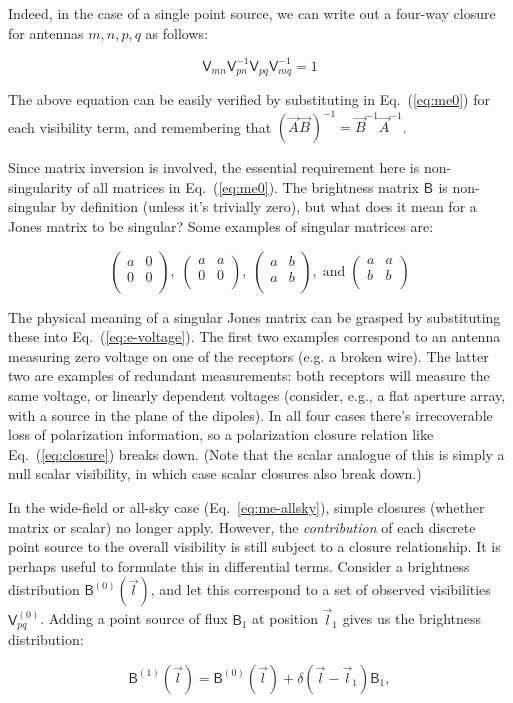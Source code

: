 \documentclass[referee]{aa}
\newcommand{\matrixtt}[4]{\left( \begin{array}{cc}#1&#2\\#3&#4\\\end{array} \right)}
\newcommand{\jones}[2]{\vec {#1}_{#2}}
\newcommand{\jonesinv}[2]{\vec {#1}^{-1}_{#2}}
\newcommand{\coh}[2]{\mathsf{{#1}}_{{#2}}}
\begin{document}
Indeed, in the case of a single point source, we can write out a four-way closure for antennas $m,n,p,q$ as follows:

\begin{equation}\label{eq:closure}
\coh{V}{mn}\coh{V}{pn}^{-1}\coh{V}{pq}\coh{V}{mq}^{-1} = 1
\end{equation}

The above equation can be easily verified by substituting in Eq.~(\ref{eq:me0}) for each visibility term, and remembering that $(\jones{A}{}\jones{B}{})^{-1}=\jonesinv{B}{}\jonesinv{A}{}$. 

Since matrix inversion is involved, the essential requirement here is non-singularity of all matrices in Eq.~(\ref{eq:me0}). The brightness matrix $\coh{B}{}$ is non-singular by definition (unless it's trivially zero), but what does it mean for a Jones matrix to be singular? Some examples of singular matrices are:

\[
\matrixtt{a}{0}{0}{0}, \; \matrixtt{a}{a}{0}{0}, \; \matrixtt{a}{b}{a}{b},\; \mathrm{and} \; \matrixtt{a}{a}{b}{b}
\]

The physical meaning of a singular Jones matrix can be grasped by substituting these into Eq.~(\ref{eq:e-voltage}). The first two examples correspond to an antenna measuring zero voltage on one of the receptors (e.g. a broken wire). The latter two are examples of redundant measurements: both receptors will measure the same voltage, or linearly dependent voltages (consider, e.g., a flat aperture array, with a source in the plane of the dipoles). In all four cases there's irrecoverable loss of polarization information, so a polarization closure relation like Eq.~(\ref{eq:closure}) breaks down. (Note that the scalar analogue of this is simply a null scalar visibility, in which case scalar closures also break down.)

In the wide-field or all-sky case (Eq.~\ref{eq:me-allsky}), simple closures (whether matrix or scalar) no longer apply. However, the \emph{contribution} of each discrete point source to the overall visibility is still subject to a closure relationship. It is perhaps useful to formulate this in differential terms. Consider a brightness distribution $\coh{B}{}^{(0)}(\vec l)$, and let this correspond to a set of observed visibilities $\coh{V}{pq}^{(0)}$. Adding a point source of flux $\coh{B}{1}$ at position $\vec l_1$ gives us the brightness distribution:

\[
\coh{B}{}^{(1)}(\vec l) = \coh{B}{}^{(0)}(\vec l)+\delta(\vec l - \vec l_1)\coh{B}{1},
\]
\end{document}
